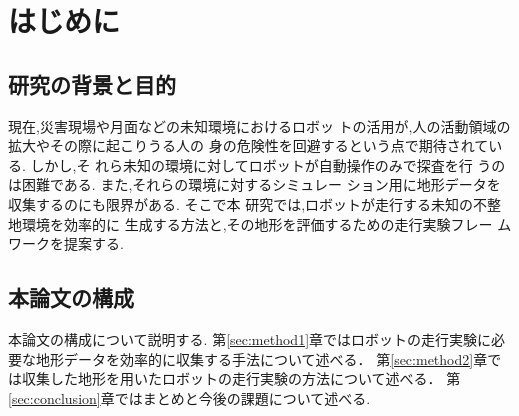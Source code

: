 \section{はじめに}
\label{sec:introduction}
\subsection{研究の背景と目的}
現在,災害現場や月面などの未知環境におけるロボッ
トの活用が,人の活動領域の拡大やその際に起こりうる人の
身の危険性を回避するという点で期待されている. しかし,そ
れら未知の環境に対してロボットが自動操作のみで探査を行
うのは困難である. \cite{bunken5}また,それらの環境に対するシミュレー
ション用に地形データを収集するのにも限界がある. \cite{bunken0}そこで本
研究では,ロボットが走行する未知の不整地環境を効率的に
生成する方法と,その地形を評価するための走行実験フレー
ムワークを提案する.




\subsection{本論文の構成}
本論文の構成について説明する.
第\ref{sec:method1}章ではロボットの走行実験に必要な地形データを効率的に収集する手法について述べる．
第\ref{sec:method2}章では収集した地形を用いたロボットの走行実験の方法について述べる．
第\ref{sec:conclusion}章ではまとめと今後の課題について述べる.
\\\\
